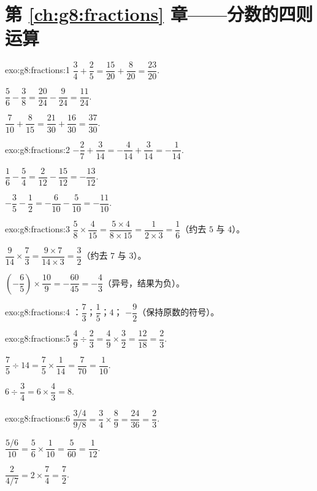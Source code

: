 \section*{第 \ref{ch:g8:fractions} 章——分数的四则运算}

\begin{solution}{exo:g8:fractions:1}
$\dfrac34 + \dfrac25 = \dfrac{15}{20} + \dfrac{8}{20} =
\dfrac{23}{20}$.

$\dfrac56 - \dfrac38 = \dfrac{20}{24} - \dfrac{9}{24} =
\dfrac{11}{24}$.

$\dfrac{7}{10} + \dfrac{8}{15} = \dfrac{21}{30} + \dfrac{16}{30} =
\dfrac{37}{30}$.
\end{solution}

\begin{solution}{exo:g8:fractions:2}
$-\dfrac27 + \dfrac{3}{14} = -\dfrac{4}{14} + \dfrac{3}{14} =
-\dfrac{1}{14}$.

$\dfrac16 - \dfrac54 = \dfrac{2}{12} - \dfrac{15}{12} =
-\dfrac{13}{12}$.

$-\dfrac35 - \dfrac12 = -\dfrac{6}{10} - \dfrac{5}{10} =
-\dfrac{11}{10}$.
\end{solution}

\begin{solution}{exo:g8:fractions:3}
$\dfrac58 \times \dfrac{4}{15} = \dfrac{5 \times 4}{8 \times 15}
= \dfrac{1}{2 \times 3} = \dfrac16$（约去 $5$ 与 $4$）。

$\dfrac{9}{14} \times \dfrac73 = \dfrac{9 \times 7}{14 \times 3}
= \dfrac{3}{2}$（约去 $7$ 与 $3$）。

$\left(-\dfrac65\right) \times \dfrac{10}{9} = -\dfrac{60}{45}
= -\dfrac43$（异号，结果为负）。
\end{solution}

\begin{solution}{exo:g8:fractions:4}
：$\dfrac73$；\quad $\dfrac15$；\quad $4$；\quad
$-\dfrac92$（保持原数的符号）。
\end{solution}

\begin{solution}{exo:g8:fractions:5}
$\dfrac49 \div \dfrac23 = \dfrac49 \times \dfrac32 = \dfrac{12}{18}
= \dfrac23$.

$\dfrac75 \div 14 = \dfrac75 \times \dfrac{1}{14} = \dfrac{7}{70}
= \dfrac{1}{10}$.

$6 \div \dfrac34 = 6 \times \dfrac43 = 8$.
\end{solution}

\begin{solution}{exo:g8:fractions:6}
$\dfrac{3/4}{9/8} = \dfrac34 \times \dfrac89 = \dfrac{24}{36} =
\dfrac23$.

$\dfrac{5/6}{10} = \dfrac56 \times \dfrac{1}{10} = \dfrac{5}{60} =
\dfrac{1}{12}$.

$\dfrac{2}{4/7} = 2 \times \dfrac74 = \dfrac72$.
\end{solution}

